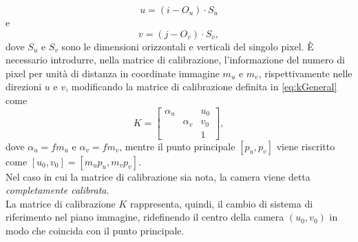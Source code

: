  \[ u = (i - O_u) \cdot S_u \]
 e
 \[ v = (j - O_v) \cdot S_v, \]
 dove $S_u$ e $S_v$ sono le dimensioni orizzontali e verticali del singolo pixel.
 \`E necessario introdurre, nella matrice di calibrazione, l'informazione del numero di pixel per unit\`a di distanza in coordinate immagine $m_u$ e $m_v$, rispettivamente nelle direzioni $u$ e $v$, modificando la matrice di calibrazione definita in \eqref{eq:kGeneral} come
 \begin{equation}
 \label{eq:kDigital}
 K =
 \left[\begin{array}{rccl}
 \alpha_u & & u_0\\
 & \alpha_v & v_0\\
 & & 1
 \end{array}\right],
 \end{equation}
 dove $\alpha_u = fm_u$ e $\alpha_v=fm_v$, mentre il punto principale $[p_u, p_v]$ viene riscritto come $[u_0, v_0] = [m_u p_u, m_v p_v]$. \\
 Nel caso in cui la matrice di calibrazione sia nota, la camera viene detta \textit{completamente calibrata}.\\
 La matrice di calibrazione $K$ rappresenta, quindi, il cambio di sistema di riferimento nel piano immagine, ridefinendo il centro della camera $(u_0, v_0)$ in modo che coincida con il punto principale.
